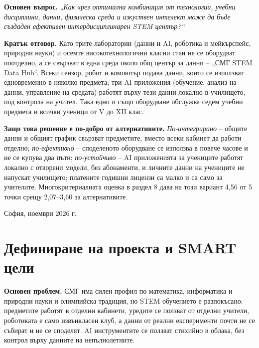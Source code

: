 \documentclass[11pt,a4paper]{article}
\begin{document}
\vspace{1.2cm}
\noindent\colorbox{sand}{\parbox{\dimexpr\textwidth-2\fboxsep}{%
\textbf{Основен въпрос.} \emph{„Как чрез оптимална комбинация от технологии, учебни дисциплини, данни, физическа среда и изкуствен интелект може да бъде създаден ефективен интердисциплинарен STEM център?“}

\smallskip
\textbf{Кратък отговор.} Като трите лаборатории (данни и AI, роботика и мейкърспейс, природни науки) и осемте високотехнологични класни стаи не се оборудват поотделно, а се свързват в една среда около общ център за данни – „СМГ STEM Data Hub“. Всеки сензор, робот и компютър подава данни, които се използват едновременно в няколко предмета; три AI приложения (обучение, анализ на данни, управление на средата) работят върху тези данни локално в училището, под контрола на учител. Така едно и също оборудване обслужва седем учебни предмета и всички ученици от V до XII клас.

\smallskip
\textbf{Защо това решение е по-добро от алтернативите.} \emph{По-интегрирано} – общите данни и общият график свързват предметите, вместо всеки кабинет да работи отделно; \emph{по-ефективно} – споделеното оборудване се използва в повече часове и не се купува два пъти; \emph{по-устойчиво} – AI приложенията за учениците работят локално с отворени модели, без абонаменти, и личните данни на учениците не напускат училището; платените годишни лицензи са малко и са само за учителите. Многокритериалната оценка в раздел 8 дава на този вариант 4,56 от 5 точки срещу 2,07–3,60 за алтернативите.}}

\vfill
\begin{center}\small София, ноември 2026 г.\end{center}
\clearpage


\clearpage
{\hypersetup{linkcolor=black}\small\tableofcontents}
\clearpage%
\section{Дефиниране на проекта и SMART цели}

\textbf{Основен проблем.} СМГ има силен профил по математика, информатика и природни науки и олимпийска традиция, но STEM обучението е разпокъсано: предметите работят в отделни кабинети, уредите се ползват от отделни учители, роботиката е само извънкласен клуб, а данни от реални експерименти почти не се събират и не се споделят. AI инструментите се ползват стихийно в облака, без контрол върху данните на непълнолетните.
\end{document}
